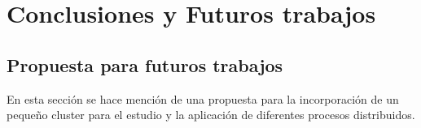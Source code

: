 \section{Conclusiones y Futuros trabajos}
\label{sec:conclusiones_y_futuros_trabajos}

\subsection{Propuesta para futuros trabajos}
\label{sec:propuesta}

En esta sección se hace mención de una propuesta para la incorporación de un
pequeño \gls{cluster} para el estudio y la aplicación de diferentes procesos
distribuidos.
